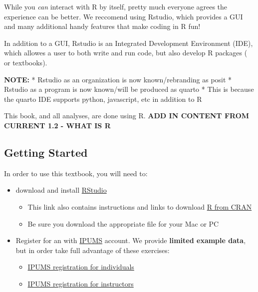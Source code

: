 \documentclass[
]{book}
\providecommand{\tightlist}{%
  \setlength{\itemsep}{0pt}\setlength{\parskip}{0pt}}
\begin{document}
While you \emph{can} interact with R by itself, pretty much everyone agrees the experience can be better. We reccomend using Rstudio, which provides a GUI and many additional handy features that make coding in R fun!

In addition to a GUI, Rstudio is an Integrated Development Environment (IDE), which allowes a user to both write and run code, but also develop R packages ( or textbooks).

\textbf{NOTE:}
* Rstudio as an organization is now known/rebranding as posit
* Rstudio as a program is now known/will be produced as quarto
* This is because the quarto IDE supports python, javascript, etc in addition to R

This book, and all analyses, are done using R.
\textbf{ADD IN CONTENT FROM CURRENT 1.2 - WHAT IS R}

\hypertarget{getting-started}{%
\subsection*{Getting Started}\label{getting-started}}

In order to use this textbook, you will need to:

\begin{itemize}
\tightlist
\item
  download and install \href{https://posit.co/download/rstudio-desktop/}{RStudio}

  \begin{itemize}
  \tightlist
  \item
    This link also contains instructions and links to download \href{https://cran.rstudio.com/}{R from CRAN}
  \item
    Be sure you download the appropriate file for your Mac or PC
  \end{itemize}
\item
  Register for an with \href{https://ipums.org}{IPUMS} account. We provide \textbf{limited example data}, but in order take full advantage of these exercises:

  \begin{itemize}
  \tightlist
  \item
    \href{https://international.ipums.org/international-action/menu}{IPUMS registration for individuals}
  \item
    \href{https://international.ipums.org/international/classroom_accounts.shtml}{IPUMS registration for instructors}
  \end{itemize}
\end{itemize}
\end{document}

